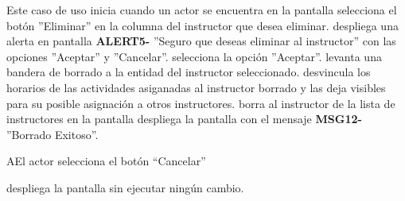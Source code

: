 \begin{UCtrayectoria}{Este caso de uso inicia cuando un actor se encuentra en la pantalla }
	\UCpaso[\UCactor] selecciona el botón ''Eliminar'' en la columna del instructor que desea eliminar.
	\UCpaso despliega una alerta en pantalla {\bf ALERT5-} ''Seguro que deseas eliminar al instructor'' con las opciones ''Aceptar'' y ''Cancelar''.
	\UCpaso[\UCactor]selecciona la opción ''Aceptar''.
	\UCpaso levanta una bandera de borrado a la entidad del instructor seleccionado.
	\UCpaso desvincula los horarios de las actividades asiganadas al instructor borrado y las deja visibles para su posible asignación a otros instructores.
	\UCpaso borra al instructor de la lista de instructores en la pantalla 
	\UCpaso despliega la pantalla  con el mensaje {\bf MSG12-} ''Borrado Exitoso''.
\end{UCtrayectoria}
\begin{UCtrayectoriaA}{A}{El actor selecciona el botón “Cancelar”}

	\UCpaso despliega la pantalla  sin ejecutar ningún cambio.

\end{UCtrayectoriaA}




